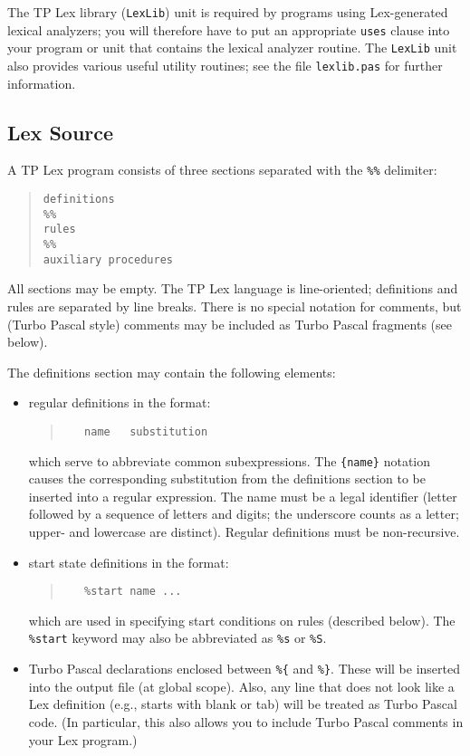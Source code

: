 The TP Lex library (\verb"LexLib") unit is required by programs using
Lex-generated lexical analyzers; you will therefore have to put an appropriate
\verb"uses" clause into your program or unit that contains the lexical
analyzer routine. The \verb"LexLib" unit also provides various useful utility
routines; see the file \verb"lexlib.pas" for further information.

\subsection{Lex Source}

A TP Lex program consists of three sections separated with the \verb"%%"
delimiter:

\begin{quote}\begin{verbatim}
definitions
%%
rules
%%
auxiliary procedures
\end{verbatim}\end{quote}

All sections may be empty. The TP Lex language is line-oriented; definitions
and rules are separated by line breaks. There is no special notation for
comments, but (Turbo Pascal style) comments may be included as Turbo Pascal
fragments (see below).

The definitions section may contain the following elements:
\begin{itemize}
   \item
      regular definitions in the format:
      \begin{quote}\begin{verbatim}
   name   substitution
      \end{verbatim}\end{quote}
      which serve to abbreviate common subexpressions. The \verb"{name}"
      notation causes the corresponding substitution from the definitions
      section to be inserted into a regular expression. The name must be
      a legal identifier (letter followed by a sequence of letters and digits;
      the underscore counts as a letter; upper- and lowercase are distinct).
      Regular definitions must be non-recursive.
   \item
      start state definitions in the format:
      \begin{quote}\begin{verbatim}
   %start name ...
      \end{verbatim}\end{quote}
      which are used in specifying start conditions on rules (described
      below). The \verb"%start" keyword may also be abbreviated as \verb"%s"
      or \verb"%S".
   \item
      Turbo Pascal declarations enclosed between \verb"%{" and \verb"%}".
      These will be inserted into the output file (at global scope). Also,
      any line that does not look like a Lex definition (e.g., starts with
      blank or tab) will be treated as Turbo Pascal code. (In particular,
      this also allows you to include Turbo Pascal comments in your Lex
      program.)
\end{itemize}

